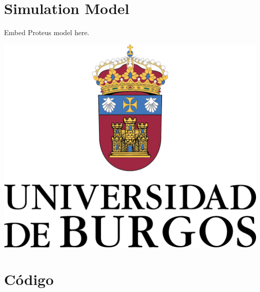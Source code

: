\documentclass[11pt]{report}
\begin{document}
\section{Simulation Model}

Embed Proteus model here. 

\includegraphics[width=6in]{./img/escudo}
    
    
    
\newpage
\section{Código}
\end{document}
